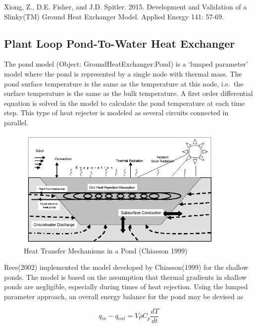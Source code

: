 Xiong, Z., D.E. Fisher, and J.D. Spitler. 2015. Development and Validation of a Slinky(TM) Ground Heat Exchanger Model. Applied Energy 141: 57-69.

\subsection{Plant Loop Pond-To-Water Heat Exchanger}\label{plant-loop-pond-to-water-heat-exchanger}

The pond model (Object: GroundHeatExchanger:Pond) is a `lumped parameter' model where the pond is represented by a single node with thermal mass. The pond surface temperature is the same as the temperature at this node, i.e.~the surface temperature is the same as the bulk temperature. A first order differential equation is solved in the model to calculate the pond temperature at each time step. This type of heat rejecter is modeled as several circuits connected in parallel.

\begin{figure}[hbtp] %
\centering
\includegraphics[width=0.9\textwidth, height=0.9\textheight, keepaspectratio=true]{media/image5676.png}
\caption{Heat Transfer Mechanisms in a Pond (Chiasson 1999) \protect \label{fig:heat-transfer-mechanisms-in-a-pond-chiasson}}
\end{figure}

Rees(2002) implemented the model developed by Chiasson(1999) for the shallow ponds. The model is based on the assumption that thermal gradients in shallow ponds are negligible, especially during times of heat rejection. Using the lumped parameter approach, an overall energy balance for the pond may be devised as

\begin{equation}
q{}_{in} - q{}_{out} = V\rho C{}_p\frac{{dT}}{{dt}}
\end{equation}

